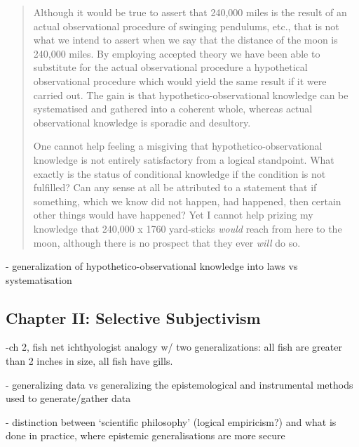 \begin{quote}
    Although it would be true to assert that 240,000 miles is the result of an actual observational procedure of swinging pendulums, etc., that is not what we intend to assert when we say that the distance of the moon is 240,000 miles.  By employing accepted theory we have been able to substitute for the actual observational procedure a hypothetical observational procedure which would yield the same result if it were carried out.  The gain is that hypothetico-observational knowledge can be systematised and gathered into a coherent whole, whereas actual observational knowledge is sporadic and desultory.
    
    One cannot help feeling a misgiving that hypothetico-observational knowledge is not entirely satisfactory from a logical standpoint.  What exactly is the status of conditional knowledge if the condition is not fulfilled?  Can any sense at all be attributed to a statement that if something, which we know did not happen, had happened, then certain other things would have happened?  Yet I cannot help prizing my knowledge that 240,000 x 1760 yard-sticks \emph{would} reach from here to the moon, although there is no prospect that they ever \emph{will} do so.
    
    \citep[p. 13]{Eddington1939}
\end{quote}

- generalization of hypothetico-observational knowledge into laws vs systematisation

\subsection{Chapter II: Selective Subjectivism}

-ch 2, fish net ichthyologist analogy w/ two generalizations: all fish are greater than 2 inches in size, all fish have gills.

- generalizing data vs generalizing the epistemological and instrumental methods used to generate/gather data

- distinction between `scientific philosophy' (logical empiricism?) and what is done in practice, where epistemic generalisations are more secure

